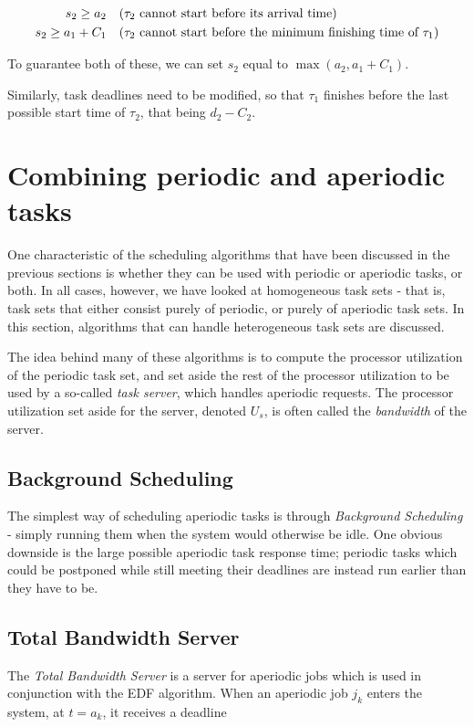 \documentclass[twoside]{uva-inf-bachelor-thesis}
\newcommand{\task}[1]{\ensuremath{\tau_#1}}
\begin{document}
\begin{align}
    s_2 \ge a_2 \quad &\text{(\task{2} cannot start before its arrival time)}\\
    s_2 \ge a_1 + C_1 \quad &\text{(\task{2} cannot start before the minimum finishing time of \task{1})}
\end{align}

To guarantee both of these, we can set $s_2$ equal to $\max(a_2, a_1 + C_1)$.

Similarly, task deadlines need to be modified, so that \task{1} finishes before the last possible start time of \task{2}, that being $d_2 - C_2$.

\section{Combining periodic and aperiodic tasks}
One characteristic of the scheduling algorithms that have been discussed in the previous sections is whether they can be used with periodic or aperiodic tasks, or both. In all cases, however, we have looked at homogeneous task sets - that is, task sets that either consist purely of periodic, or purely of aperiodic task sets. In this section, algorithms that can handle heterogeneous task sets are discussed.

The idea behind many of these algorithms is to compute the processor utilization of the periodic task set, and set aside the rest of the processor utilization to be used by a so-called \emph{task server}, which handles aperiodic requests. The processor utilization set aside for the server, denoted $U_s$, is often called the \emph{bandwidth} of the server.

\subsection{Background Scheduling}
The simplest way of scheduling aperiodic tasks is through \emph{Background Scheduling} - simply running them when the system would otherwise be idle. One obvious downside is the large possible aperiodic task response time; periodic tasks which could be postponed while still meeting their deadlines are instead run earlier than they have to be.

\subsection{Total Bandwidth Server}
The \emph{Total Bandwidth Server} is a server for aperiodic jobs which is used in conjunction with the EDF algorithm. When an aperiodic job $j_k$ enters the system, at $t = a_k$, it receives a deadline
\end{document}
